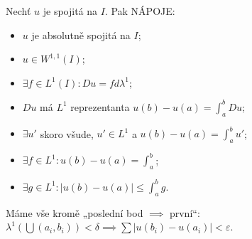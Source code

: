 \documentclass[12pt]{article}					%
\begin{document}
\begin{veta}
	Nechť $u$ je spojitá na $I$. Pak NÁPOJE:
	\begin{itemize}
		\item $u$ je absolutně spojitá na $I$;
		\item $u \in W^{1, 1}(I)$;
		\item $\exists f \in L^1(I): Du = fdλ^1$;
		\item $Du$ má $L^1$ reprezentanta $u(b) - u(a) = \int_a^b Du$;
		\item $\exists u'$ skoro všude, $u' \in L^1$ a $u(b) - u(a) = \int_a^b u'$;
		\item $\exists f \in L^1: u(b) - u(a) = \int_a^b$;
		\item $\exists g \in L^1: |u(b) - u(a)| ≤ \int_a^b g$.
	\end{itemize}

	\begin{dukazin}
		Máme vše kromě „poslední bod $\implies$ první“: $λ^1(\bigcup(a_i, b_i)) < δ \implies \sum |u(b_i) - u(a_i)| < ε$.
	\end{dukazin}
\end{veta}
\end{document}
